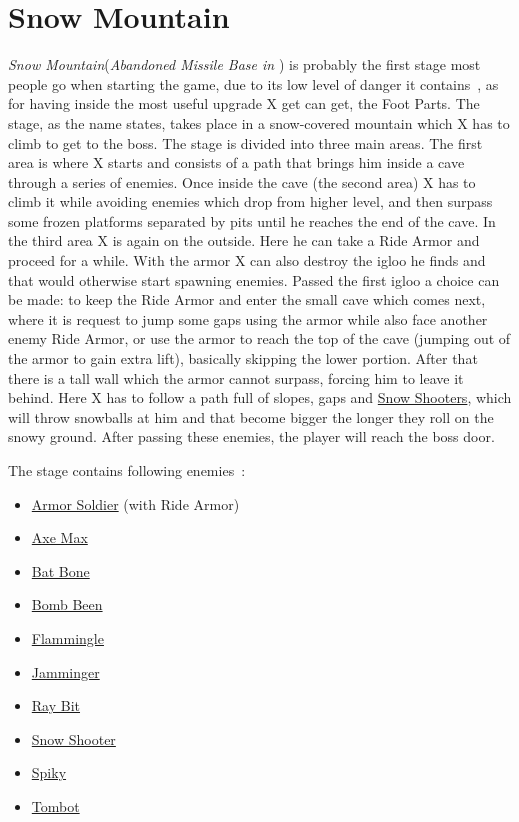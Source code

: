 \section{Snow Mountain}
\textit{Snow Mountain}(\textit{Abandoned Missile Base in \mhx}) is probably the first stage most people go when starting the game, due to its low level of danger it contains~\cite{stratwiki:Snow_mountain}, as for having inside the most useful upgrade X get can get, the Foot Parts. The stage, as the name states, takes place in a snow-covered mountain which X has to climb to get to the boss. The stage is divided into three main areas. The first area is where X starts and consists of a path that brings him inside a cave through a series of enemies. Once inside the cave (the second area) X has to climb it while avoiding enemies which drop from higher level, and then surpass some frozen platforms separated by pits until he reaches the end of the cave. In the third area X is again on the outside. Here he can take a Ride Armor and proceed for a while. With the armor X can also destroy the igloo he finds and that would otherwise start spawning enemies. Passed the first igloo a choice can be made: to keep the Ride Armor and enter the small cave which comes next, where it is request to jump some gaps using the armor while also face another enemy Ride Armor, or use the armor to reach the top of the cave (jumping out of the armor to gain extra lift), basically skipping the lower portion. After that there is a tall wall which the armor cannot surpass, forcing him to leave it behind. Here X has to follow a path full of slopes, gaps and \hyperlink{enem:Snow_Shooter}{Snow Shooters}, which will throw snowballs at him and that become bigger the longer they roll on the snowy ground. After passing these enemies, the player will reach the boss door.

The stage contains following enemies~\cite{wiki:Snow_mountain}:
\begin{itemize}
	\item \hyperlink{enem:Armor_Soldier}{Armor Soldier} (with Ride Armor)
	\item \hyperlink{enem:Axe_Max}{Axe Max}
	\item \hyperlink{enem:Batton_Bone}{Bat Bone}
	\item \hyperlink{enem:Bomb_Been}{Bomb Been}
	\item \hyperlink{enem:Flammingle}{Flammingle}
	\item \hyperlink{enem:Jamminger}{Jamminger }
	\item \hyperlink{enem:Ray_Bit}{Ray Bit}
	\item \hyperlink{enem:Snow_Shooter}{Snow Shooter}
	\item \hyperlink{enem:Spiky}{Spiky}
	\item \hyperlink{enem:Tombot}{Tombot}
\end{itemize}

